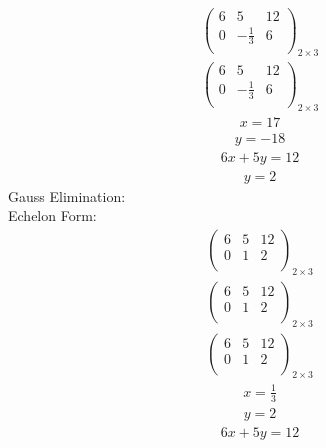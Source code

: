 \documentclass{article}
\begin{document}
\begin{align*}
\left(
\begin{array}{cc|c}
6 & 5 & 12\\
0 & -\frac{1}{3} & 6\\
\end{array}
\right)_{2\times 3}
\end{align*}
\begin{align*}
\left(
\begin{array}{cc|c}
6 & 5 & 12\\
0 & -\frac{1}{3} & 6\\
\end{array}
\right)_{2\times 3}
\end{align*}
\begin{align*}
x=17\end{align*}
\begin{align*}
y=-18\end{align*}
\begin{align*}
6x + 5y=12\end{align*}
\begin{align*}
y=2\end{align*}
Gauss Elimination:\\
Echelon Form:\\
\begin{align*}
\left(
\begin{array}{cc|c}
6 & 5 & 12\\
0 & 1 & 2\\
\end{array}
\right)_{2\times 3}
\end{align*}
\begin{align*}
\left(
\begin{array}{cc|c}
6 & 5 & 12\\
0 & 1 & 2\\
\end{array}
\right)_{2\times 3}
\end{align*}
\begin{align*}
\left(
\begin{array}{cc|c}
6 & 5 & 12\\
0 & 1 & 2\\
\end{array}
\right)_{2\times 3}
\end{align*}
\begin{align*}
x=\frac{1}{3}\end{align*}
\begin{align*}
y=2\end{align*}
\begin{align*}
6x + 5y=12\end{align*}
\end{document}
